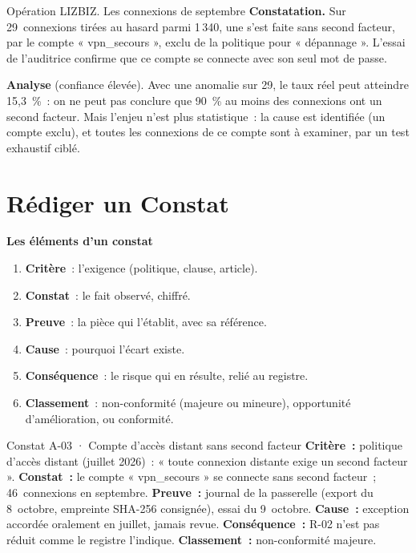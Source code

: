 \begin{boxscenario}{Opération LIZBIZ. Les connexions de septembre}
\textbf{Constatation.} Sur 29~connexions tirées au hasard parmi 1\,340,
une s'est faite sans second facteur, par le compte « vpn\_secours »,
exclu de la politique pour « dépannage ». L'essai de l'auditrice confirme
que ce compte se connecte avec son seul mot de passe.

\medskip
\textbf{Analyse} (confiance élevée). Avec une anomalie sur 29, le taux
réel peut atteindre 15,3~\%~: on ne peut pas conclure que 90~\% au moins
des connexions ont un second facteur. Mais l'enjeu n'est plus statistique~:
la cause est identifiée (un compte exclu), et toutes les connexions de ce
compte sont à examiner, par un test exhaustif ciblé.
\end{boxscenario}

\section{Rédiger un Constat}
\label{sec:c13-constat}

\begin{boxprocedure}
\textbf{Les éléments d'un constat}
\begin{enumerate}
    \item \textbf{Critère}~: l'exigence (politique, clause, article).
    \item \textbf{Constat}~: le fait observé, chiffré.
    \item \textbf{Preuve}~: la pièce qui l'établit, avec sa référence.
    \item \textbf{Cause}~: pourquoi l'écart existe.
    \item \textbf{Conséquence}~: le risque qui en résulte, relié au registre.
    \item \textbf{Classement}~: non-conformité (majeure ou mineure),
          opportunité d'amélioration, ou conformité.
\end{enumerate}
\end{boxprocedure}

\begin{boxobjet}{Constat A-03 · Compte d'accès distant sans second facteur}
\textbf{Critère~:} politique d'accès distant (juillet 2026)~: « toute
connexion distante exige un second facteur ». \textbf{Constat~:} le compte
« vpn\_secours » se connecte sans second facteur~; 46~connexions en
septembre. \textbf{Preuve~:} journal de la passerelle (export du 8~octobre,
empreinte SHA-256 consignée), essai du 9~octobre. \textbf{Cause~:}
exception accordée oralement en juillet, jamais revue. \textbf{Conséquence~:}
R-02 n'est pas réduit comme le registre l'indique. \textbf{Classement~:}
non-conformité majeure.
\end{boxobjet}


